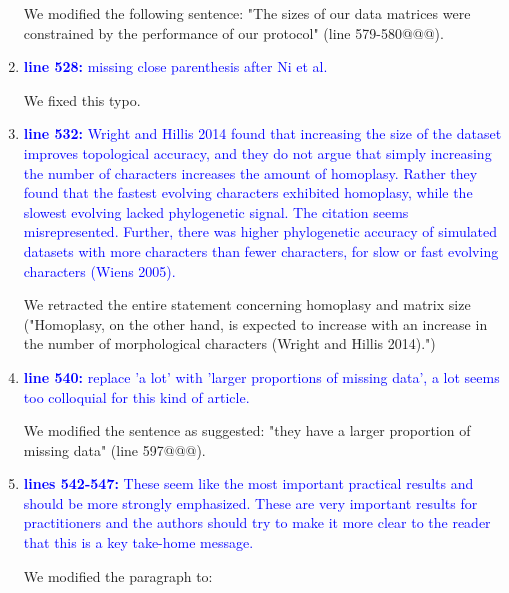 \documentclass[12pt,letterpaper]{article}
\begin{document}
\begin{enumerate}
We modified the following sentence: "The sizes of our data matrices were constrained by the performance of our protocol" (line 579-580@@@).

\item{\textcolor{blue}{\textbf{line 528:} missing close parenthesis after Ni et al.}}

We fixed this typo.

\item{\textcolor{blue}{\textbf{line 532:} Wright and Hillis 2014 found that increasing the size of the dataset improves topological accuracy, and they do not argue that simply increasing the number of characters increases the amount of homoplasy. Rather they found that the fastest evolving characters exhibited homoplasy, while the slowest evolving lacked phylogenetic signal. The citation seems misrepresented. Further, there was higher phylogenetic accuracy of simulated datasets with more characters than fewer characters, for slow or fast evolving characters (Wiens 2005).}}

We retracted the entire statement concerning homoplasy and matrix size ("Homoplasy, on the other hand, is expected to increase with an increase in the number of morphological characters (Wright and Hillis 2014).")

\item{\textcolor{blue}{\textbf{line 540:} replace 'a lot' with 'larger proportions of missing data', a lot seems too colloquial for this kind of article. }}

We modified the sentence as suggested: "they have a larger proportion of missing data" (line 597@@@).

\item{\textcolor{blue}{\textbf{lines 542-547:} These seem like the most important practical results and should be more strongly emphasized. These are very important results for practitioners and the authors should try to make it more clear to the reader that this is a key take-home message.}}

We modified the paragraph to:


\end{enumerate}
\end{document}
